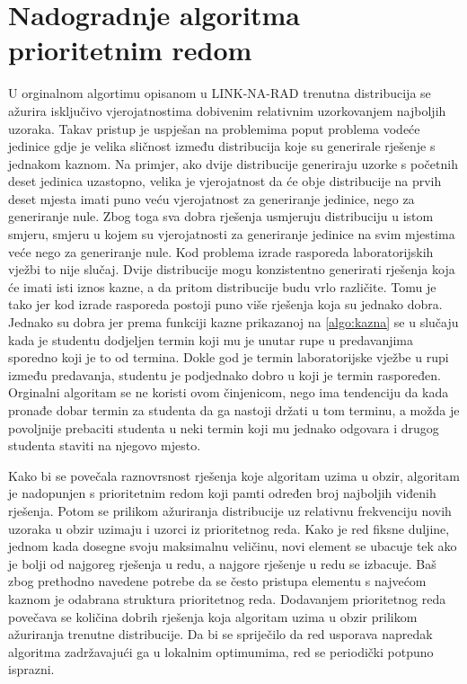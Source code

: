 \documentclass[times, utf8, zavrsni]{fer}
\begin{document}
\section{Nadogradnje algoritma prioritetnim redom}
U orginalnom algortimu opisanom u LINK-NA-RAD trenutna distribucija se ažurira isključivo vjerojatnostima dobivenim relativnim
uzorkovanjem najboljih uzoraka. Takav pristup je uspješan na problemima poput problema vodeće jedinice gdje je velika sličnost
između distribucija koje su generirale rješenje s jednakom kaznom. Na primjer, ako dvije distribucije generiraju uzorke s početnih
deset jedinica uzastopno, velika je vjerojatnost da će obje distribucije na prvih deset mjesta imati puno veću vjerojatnost
za generiranje jedinice, nego za generiranje nule. Zbog toga sva dobra rješenja usmjeruju distribuciju u istom smjeru,
smjeru u kojem su vjerojatnosti za generiranje jedinice na svim mjestima veće nego za generiranje nule.
Kod problema izrade rasporeda laboratorijskih vježbi to nije slučaj. Dvije
distribucije mogu konzistentno generirati rješenja koja će imati isti iznos kazne, a da pritom distribucije budu vrlo različite.
Tomu je tako jer kod izrade rasporeda postoji puno više rješenja koja su jednako dobra. Jednako su dobra jer prema funkciji
kazne prikazanoj na \ref{algo:kazna} se u slučaju kada je studentu dodjeljen termin koji mu je unutar rupe u predavanjima
sporedno koji je to od termina. Dokle god je termin laboratorijske vježbe u rupi između predavanja, studentu je podjednako dobro
u koji je termin raspoređen. Orginalni algoritam se ne koristi ovom činjenicom, nego ima tendenciju da kada pronađe dobar termin
za studenta da ga nastoji držati u tom terminu, a možda je povoljnije prebaciti studenta u neki termin koji mu jednako odgovara
i drugog studenta staviti na njegovo mjesto.

Kako bi se povečala raznovrsnost rješenja koje algoritam uzima u obzir, algoritam je nadopunjen s prioritetnim redom
koji pamti određen broj najboljih viđenih rješenja. Potom se prilikom ažuriranja distribucije uz relativnu frekvenciju novih uzoraka
u obzir uzimaju i uzorci iz prioritetnog reda. Kako je red fiksne duljine, jednom kada dosegne svoju maksimalnu veličinu,
novi element se ubacuje tek ako je bolji od najgoreg rješenja u redu, a najgore rješenje u redu se izbacuje. Baš zbog
prethodno navedene potrebe da se često pristupa elementu s najvećom kaznom je odabrana struktura prioritetnog reda. Dodavanjem
prioritetnog reda povečava se količina dobrih rješenja koja algoritam uzima u obzir prilikom ažuriranja trenutne distribucije.
Da bi se spriječilo da red usporava napredak algoritma zadržavajući ga u lokalnim optimumima, red se periodički potpuno isprazni.
\end{document}
